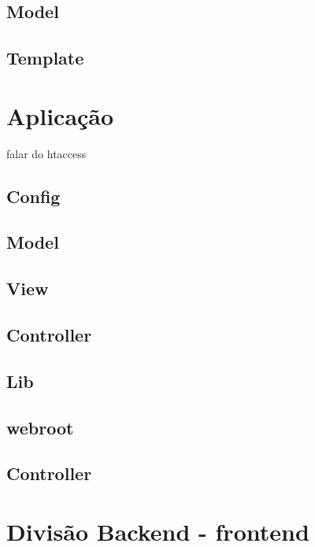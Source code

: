         \subsection{Model\label{sub:system-model}}

        \subsection{Template\label{sub:system-template}}


    \section{Aplicação\label{sec:app}}

        falar do htaccess

        \subsection{Config\label{sec:app-config}}

        \subsection{Model\label{sec:app-model}}

        \subsection{View\label{sec:app-view}}

        \subsection{Controller\label{sec:app-controller}}

        \subsection{Lib\label{sec:app-lib}}

        \subsection{webroot\label{sec:app-lib}}


        \subsection{Controller\label{sec:app-controller}}


    \section{Divisão Backend - frontend\label{sec:back-front}}


